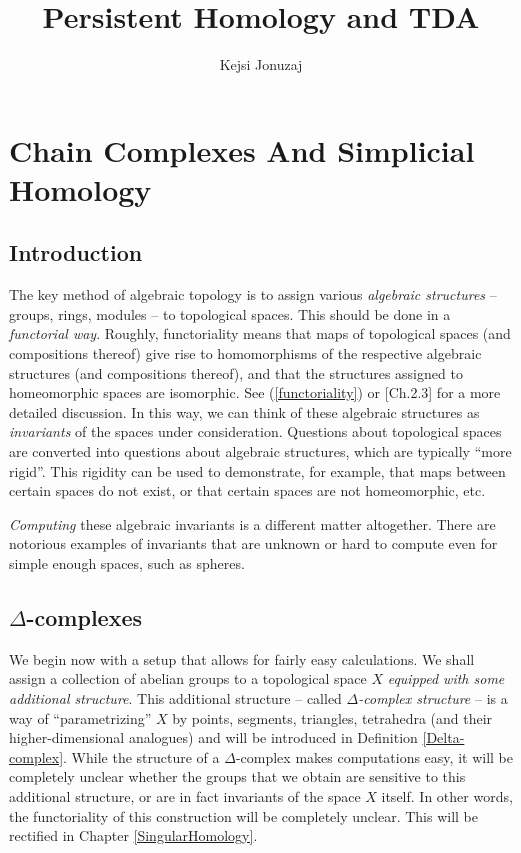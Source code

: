 \documentclass[11pt,a4paper]{report}
\author{Kejsi Jonuzaj}
\title{Persistent Homology and TDA}
\begin{document}
	
\maketitle	
\setcounter{tocdepth}{1}	
\tableofcontents	
    	
      \chapter{Chain Complexes And Simplicial Homology}	
      \label{chapter1}	
      \section{Introduction} 	
      	
	      	
	      The key method of  algebraic topology is to assign various \emph{algebraic structures} -- groups, rings, modules --  to topological spaces.	
	      This should be done in a	
	      \emph{ functorial way}. 	
	      Roughly, functoriality means that maps of topological spaces (and compositions thereof) give rise to 	
	      homomorphisms of the respective algebraic structures	
	      (and compositions thereof), and that the structures assigned to homeomorphic spaces are isomorphic. 	
	      See (\ref{functoriality}) or \cite{hatcher}[Ch.2.3] for a more detailed discussion.	
	      In this way,	
	      we can think of these algebraic structures as \emph{invariants} of the spaces under consideration.	
	      Questions about topological	
	      spaces  are converted into questions about algebraic structures, which  are typically ``more rigid''. This rigidity can	
	      be used to demonstrate, for example,  that maps between certain spaces do not exist, or that certain spaces are not homeomorphic, etc. 	
	      	
	      \emph{Computing} these algebraic invariants is a different matter altogether. There are notorious examples of invariants that are unknown or	
	      hard to compute even for simple enough spaces, such as spheres.	
	      	
	      \section{$\Delta$-complexes}	
	      	
	      We begin now with a setup that allows for fairly easy calculations. We shall	
	      assign a collection of abelian groups to a topological space $X$ \emph{equipped with some additional structure}.	
	      This additional structure -- called \emph{$\Delta$-complex structure} -- is a way of ``parametrizing'' $X$ by points, 	
	      segments, triangles, tetrahedra (and their higher-dimensional analogues) and will be introduced in Definition \ref{Delta-complex}.	
	      While the structure of a $\Delta$-complex makes computations easy, it will be completely unclear whether the groups that we obtain are sensitive	
	      to this additional structure, or are in fact invariants  of the space $X$ itself. In other words, the functoriality of this construction will be completely unclear.	
	      This will be rectified in Chapter \ref{SingularHomology}.	
	      	
\end{document}
